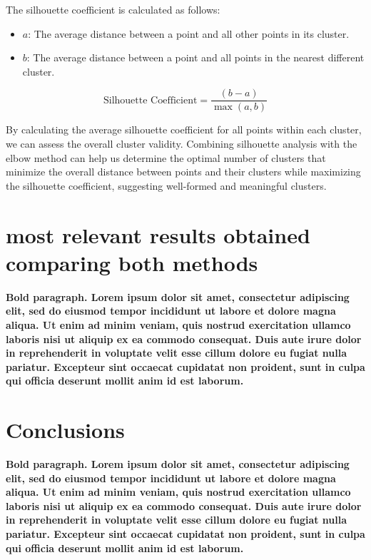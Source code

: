 \documentclass{llncs}
\begin{document}
The silhouette coefficient is calculated as follows:

\begin{itemize}
	\item \(a\): The average distance between a point and all other points in its cluster.
	\item \(b\): The average distance between a point and all points in the nearest different cluster.
\end{itemize}

\[
\text{Silhouette Coefficient} = \frac{(b - a)}{\max(a, b)}
\]

By calculating the average silhouette coefficient for all points within each cluster, we can assess the overall cluster validity. Combining silhouette analysis with the elbow method can help us determine the optimal number of clusters that minimize the overall distance between points and their clusters while maximizing the silhouette coefficient, suggesting well-formed and meaningful clusters.

\section{most relevant results obtained comparing both methods}

\textbf{Bold paragraph. Lorem ipsum dolor sit amet, consectetur adipiscing elit, sed do eiusmod tempor incididunt ut labore et dolore magna aliqua. Ut enim ad minim veniam, quis nostrud exercitation ullamco laboris nisi ut aliquip ex ea commodo consequat. Duis aute irure dolor in reprehenderit in voluptate velit esse cillum dolore eu fugiat nulla pariatur. Excepteur sint occaecat cupidatat non proident, sunt in culpa qui officia deserunt mollit anim id est laborum.}
 
 
 \section{Conclusions}
 
 \textbf{Bold paragraph. Lorem ipsum dolor sit amet, consectetur adipiscing elit, sed do eiusmod tempor incididunt ut labore et dolore magna aliqua. Ut enim ad minim veniam, quis nostrud exercitation ullamco laboris nisi ut aliquip ex ea commodo consequat. Duis aute irure dolor in reprehenderit in voluptate velit esse cillum dolore eu fugiat nulla pariatur. Excepteur sint occaecat cupidatat non proident, sunt in culpa qui officia deserunt mollit anim id est laborum.}

\end{document}
